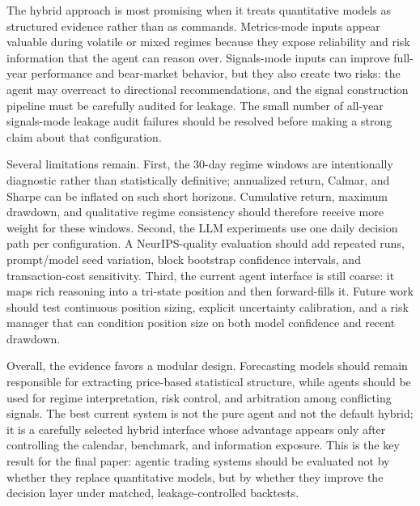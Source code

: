 The hybrid approach is most promising when it treats quantitative models as structured evidence rather than as commands.  Metrics-mode inputs appear valuable during volatile or mixed regimes because they expose reliability and risk information that the agent can reason over.  Signals-mode inputs can improve full-year performance and bear-market behavior, but they also create two risks: the agent may overreact to directional recommendations, and the signal construction pipeline must be carefully audited for leakage.  The small number of all-year signals-mode leakage audit failures should be resolved before making a strong claim about that configuration.

Several limitations remain.  First, the 30-day regime windows are intentionally diagnostic rather than statistically definitive; annualized return, Calmar, and Sharpe can be inflated on such short horizons.  Cumulative return, maximum drawdown, and qualitative regime consistency should therefore receive more weight for these windows.  Second, the LLM experiments use one daily decision path per configuration.  A NeurIPS-quality evaluation should add repeated runs, prompt/model seed variation, block bootstrap confidence intervals, and transaction-cost sensitivity.  Third, the current agent interface is still coarse: it maps rich reasoning into a tri-state position and then forward-fills it.  Future work should test continuous position sizing, explicit uncertainty calibration, and a risk manager that can condition position size on both model confidence and recent drawdown.

Overall, the evidence favors a modular design.  Forecasting models should remain responsible for extracting price-based statistical structure, while agents should be used for regime interpretation, risk control, and arbitration among conflicting signals.  The best current system is not the pure agent and not the default hybrid; it is a carefully selected hybrid interface whose advantage appears only after controlling the calendar, benchmark, and information exposure.  This is the key result for the final paper: agentic trading systems should be evaluated not by whether they replace quantitative models, but by whether they improve the decision layer under matched, leakage-controlled backtests.
